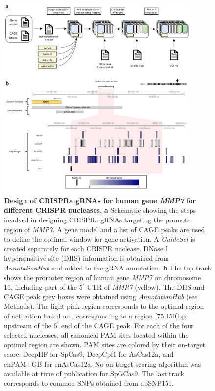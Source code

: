\documentclass[pdftex,english,10pt]{article}
\begin{document}
\begin{figure}
\centering
\includegraphics[width=0.9\textwidth]{analyses/crispra/figures/crispra_final.pdf}
  \caption{\textbf{Design of CRISPRa gRNAs for human gene \textit{MMP7} for different CRISPR nucleases.} 
  \textbf{a} Schematic showing the steps involved in designing CRISPRa gRNAs targeting the promoter region of \textit{MMP7}.
A gene model and a list of CAGE peaks are used to define the optimal window for gene activation. 
A \textit{GuideSet} is created separately for each CRISPR nuclease.
DNase I hypersensitive site (DHS) information is obtained from \textit{AnnotationHub} and added to the gRNA annotation.
\textbf{b} The top track shows the promoter region of human gene \textit{MMP7} on chromosome 11, including part of the 5$^\prime$ UTR of \textit{MMP7} (yellow). 
The DHS and CAGE peak grey boxes were obtained using \textit{AnnotationHub} (see Methods). 
The light pink region corresponds to the optimal region of activation based on \citet{sanson2018optimized}, corresponding to a region [75,150]bp upstream of the  $5^\prime$ end of the CAGE peak. For each of the four selected nucleases, all canonical PAM sites located within the optimal region are shown. PAM sites are colored by their on-target score: DeepHF for SpCas9, DeepCpf1 for AsCas12a, and enPAM+GB for enAsCas12a. No on-target scoring algorithm was available at time of publication for SpGCas9. The last track corresponds to common SNPs obtained from dbSNP151. 
  }
  \label{fig:crispra}
\end{figure}
\end{document}
